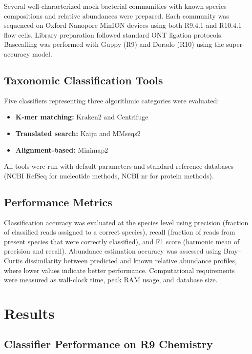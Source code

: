\documentclass[11pt]{article}
\begin{document}
Several well-characterized mock bacterial communities with known species compositions and relative abundances were prepared. Each community was sequenced on Oxford Nanopore MinION devices using both R9.4.1 and R10.4.1 flow cells. Library preparation followed standard ONT ligation protocols. Basecalling was performed with Guppy (R9) and Dorado (R10) using the super-accuracy model.

\subsection{Taxonomic Classification Tools}

Five classifiers representing three algorithmic categories were evaluated:
\begin{itemize}
    \item \textbf{K-mer matching:} Kraken2 \citep{wood2019} and Centrifuge \citep{kim2016}
    \item \textbf{Translated search:} Kaiju \citep{menzel2016} and MMseqs2 \citep{steinegger2017}
    \item \textbf{Alignment-based:} Minimap2 \citep{li2018}
\end{itemize}
All tools were run with default parameters and standard reference databases (NCBI RefSeq for nucleotide methods, NCBI nr for protein methods).

\subsection{Performance Metrics}

Classification accuracy was evaluated at the species level using precision (fraction of classified reads assigned to a correct species), recall (fraction of reads from present species that were correctly classified), and F1 score (harmonic mean of precision and recall). Abundance estimation accuracy was assessed using Bray--Curtis dissimilarity between predicted and known relative abundance profiles, where lower values indicate better performance. Computational requirements were measured as wall-clock time, peak RAM usage, and database size.

\section{Results}

\subsection{Classifier Performance on R9 Chemistry}
\end{document}

